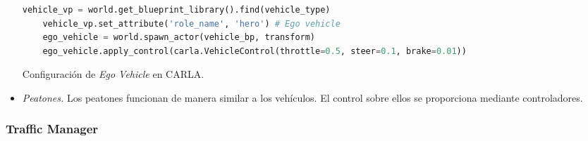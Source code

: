 \begin{itemize}
\begin{code}[h]
\begin{lstlisting}[language=python]
	vehicle_vp = world.get_blueprint_library().find(vehicle_type)
	vehicle_vp.set_attribute('role_name', 'hero') # Ego vehicle
	ego_vehicle = world.spawn_actor(vehicle_bp, transform)
	ego_vehicle.apply_control(carla.VehicleControl(throttle=0.5, steer=0.1, brake=0.01))

	\end{lstlisting}
	\caption[Configuración de \textit{Ego Vehicle} en CARLA]{Configuración de \textit{Ego Vehicle} en CARLA.}
	\label{cod:ego_carla}
	\end{code}
    \item \textit{Peatones.} Los peatones funcionan de manera similar a los vehículos. El control sobre ellos se proporciona mediante controladores.
\end{itemize}

\subsubsection{Traffic Manager}















